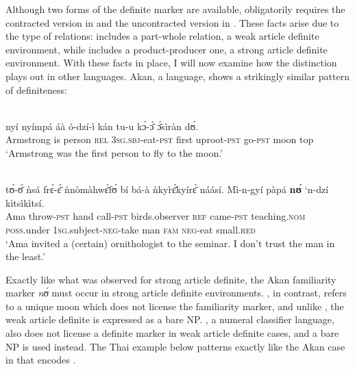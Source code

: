 \documentclass[output=paper,
modfonts
]{langscibook}
\begin{document}
Although two forms of the definite marker are available,  obligatorily requires the contracted version in  and the uncontracted version in . These facts arise due to the type of  relations:  includes a part-whole relation, a weak article definite environment, while  includes a product-producer one, a strong article definite environment. With these  facts in place, I will now examine how the distinction plays out in other languages. Akan, a  language, shows a strikingly similar pattern of definiteness: 

\begin{exe} 
\ex \label{ex:irani:16} \\  {ny{\'i}} {ny{\'i}mp{\'a}} {{\'a}{\`a}} {{\'o}-dz{\'i}-{\`i}} {k{\'a}n} {tu-u} {k{\'ɔ}-{\'{\={ɔ}}}} {{\'{\={ɔ}}}s{\`i}r{\`a}n} {d{\'ʊ}}.\\
Armstrong is person \textsc{rel} 3\textsc{sg}.\textsc{sbj}-eat-\textsc{pst} first uproot-\textsc{pst} go-\textsc{pst} moon top\\
\trans `Armstrong was the first person to fly to the moon.’ 

\ex\label{ex:irani:17} \\  {t{\'ʊ}-{\'{\={ʊ}}}} {{\`n}s{\'a}} {fr{\'ɛ}-{\'{\={ɛ}}}} {{\`n}n{\`o}m{\`a}hw{\'{\={ɛ}}}f{\'ʊ}} {b{\'i}} {b{\'a}-{\`a}} {{\`n}ky{\`r}{\'{\={ɛ}}}ky{\'i}r{\'{\={ɛ}}}} {n{\'a}{\'a}s{\'i}}. {M{\`i}-n-gy{\'i}} {p{\`a}p{\'a}} {\textbf{n{\'ʊ}}} {`n-dz{\'i}} {k{\`i}ts{\`i}k{\`i}ts{\'i}}. \\
Ama throw-\textsc{pst} hand call-\textsc{pst} birds.observer \textsc{ref} came-\textsc{pst} teaching.\textsc{nom} \textsc{poss}.under 1\textsc{sg}.subject-\textsc{neg}-take man \textsc{fam} \textsc{neg}-eat small.\textsc{red}\\
\trans `Ama invited a (certain) ornithologist to the seminar. I don’t trust the man in the least.' 
\end{exe}

Exactly like what was observed for  strong article definite, the Akan familiarity marker \textit{n{\'ʊ}} must occur in strong article definite environments. , in contrast, refers to a unique moon which does not license the familiarity marker, and unlike , the weak article definite is expressed as a bare NP. , a numeral classifier language, also does not license a definite marker in weak article definite cases, and a bare NP is used instead. The Thai example below patterns exactly like the Akan case in  that encodes . 
\end{document}
